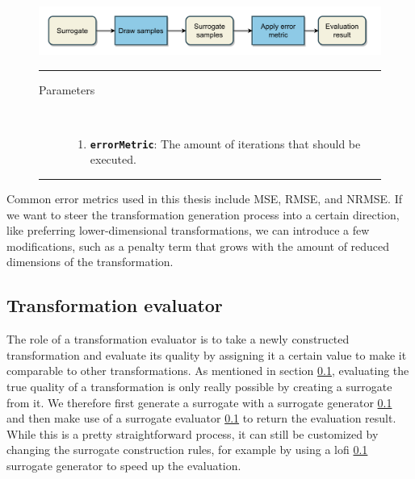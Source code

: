 \documentclass[
  a4paper,  %
  twoside,  %
  bibliography=totoc,
  headsepline,
  cleardoublepage=empty,
  parskip=half,
  draft=false
]{scrbook}
\newcommand{\delimit}{{\color{charcoal}\noindent\rule{\textwidth}{1pt}}}
\begin{document}
\begin{mdframed}[style=style,frametitle={Surrogate evaluator}]
\begin{figure}[H]
\includegraphics[width=\textwidth]{graphics/SurrogateEval.pdf}
\vspace{-4.5mm}

\delimit

\begin{description}
\item[Parameters] {~ \begin{enumerate}[\indent{}]
\item \texttt{\textbf{errorMetric}}: The amount of iterations that should be executed.
\end{enumerate}}
\end{description}

\delimit

\label{fig:se}
\end{figure}
\end{mdframed}

Common error metrics used in this thesis include MSE, RMSE, and NRMSE.
If we want to steer the transformation generation process into a certain direction, like preferring lower-dimensional transformations, we can introduce a few modifications, such as a penalty term that grows with the amount of reduced dimensions of the transformation.

\subsection {Transformation evaluator}

The role of a transformation evaluator is to take a newly constructed transformation and evaluate its quality by assigning it a certain value to make it comparable to other transformations.
As mentioned in section \ref{}, evaluating the true quality of a transformation is only really possible by creating a surrogate from it.
We therefore first generate a surrogate with a surrogate generator \ref{} and then make use of a surrogate evaluator \ref{} to return the evaluation result.
While this is a pretty straightforward process, it can still be customized by changing the surrogate construction rules, for example by using a lofi \ref{} surrogate generator to speed up the evaluation.
\end{document}

